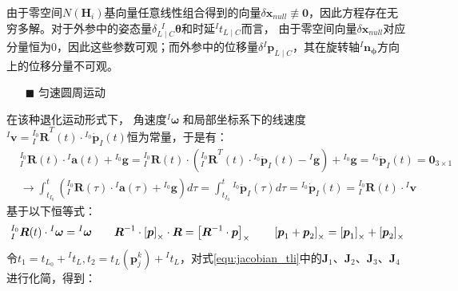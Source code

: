 由于零空间$N(\boldsymbol{H}_i)$基向量任意线性组合得到的向量$\delta\boldsymbol{x}_{null}\not\equiv\boldsymbol{0}$，因此方程存在无穷多解。对于外参中的姿态量$\delta {^{\;\;I}_{L\mid C}\boldsymbol{\theta}}$和时延${^{I}t_{L\mid C}}$而言，
由于零空间向量$\delta\boldsymbol{x}_{null}$对应分量恒为0，因此这些参数可观；而外参中的位移量$\delta {^{I}\boldsymbol{p}_{L\mid C}}$，其在旋转轴${^{I}\boldsymbol{n}_{\boldsymbol{\phi}}}$方向上的位移分量不可观。

\begin{itemize}
  \item[$\blacksquare$]匀速圆周运动
\end{itemize}

在该种退化运动形式下，
角速度${^{I}\boldsymbol{\omega}}$
和局部坐标系下的线速度${^{I}\boldsymbol{v}}={^{I_0}_{I}\boldsymbol{R}}^{T}(t)\cdot{^{I_0}\dot{\boldsymbol{p}}_{I}(t)}$恒为常量，于是有：
\begin{equation}
  \begin{aligned}
     & {^{I_0}_{I}\boldsymbol{R}}(t)\cdot{^{I}\boldsymbol{a}}(t)+{^{I_0}\boldsymbol{g}}=
    {^{I_0}_{I}\boldsymbol{R}}(t)\cdot
    \left(
    {^{I_0}_{I}\boldsymbol{R}}^{T}(t)\cdot{^{I_0}\ddot{\boldsymbol{p}}_{I}(t)}-{^{I}\boldsymbol{g}}
    \right)
    +{^{I_0}\boldsymbol{g}}={^{I_0}\ddot{\boldsymbol{p}}_{I}(t)}=\boldsymbol{0}_{3\times 1} \\
     & \to
    \int_{t_{I_0}}^{t}\left(
    {^{I_0}_{I}\boldsymbol{R}}(\tau)\cdot{^{I}\boldsymbol{a}}(\tau)+{^{I_0}\boldsymbol{g}}
    \right)d\tau
    =\int_{t_{I_0}}^{t} {^{I_0}\ddot{\boldsymbol{p}}_{I}(\tau)} d\tau
    ={^{I_0}\dot{\boldsymbol{p}}_{I}(t)}
    ={^{I_0}_{I}\boldsymbol{R}}(t)\cdot{^{I}\boldsymbol{v}}
  \end{aligned}
\end{equation}
基于以下恒等式：
\begin{equation*}
  {{^{I_0}_{I}}\boldsymbol{R}}(t)\cdot{^{I}\boldsymbol{\omega}}={^{I}\boldsymbol{\omega}}
  \quad\quad
  \boldsymbol{R}^{-1}\cdot\left[ \boldsymbol{p} \right]_\times\cdot\boldsymbol{R}=\left[ \boldsymbol{R}^{-1}\cdot\boldsymbol{p} \right]_\times
  \quad\quad
  \left[ \boldsymbol{p}_1+\boldsymbol{p}_2 \right]_\times=\left[ \boldsymbol{p}_1 \right]_\times+\left[ \boldsymbol{p}_2 \right]_\times
\end{equation*}
令$t_1=t_{L_0}+{^{I}t_L},t_2=t_{L}(\boldsymbol{p}_j^k)+{^{I}t_L}$，对式\ref{equ:jacobian_tli}中的$\boldsymbol{J}_1$、$\boldsymbol{J}_2$、$\boldsymbol{J}_3$、$\boldsymbol{J}_4$进行化简，得到：
